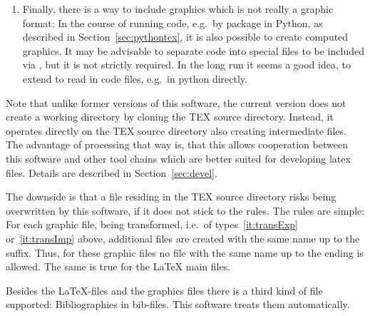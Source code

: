 \begin{enumerate}
The fourth kind of graphics formats 
has to be transformed into one of the kinds one or two 
but unlike in type three, this is not done explicitly 
by an external tool but by a latex-package during the \LaTeX-run. 
Note that, although not required to be explicitly transformed, 
those graphics files induce additional files 
by running \LaTeX.
Essentially, each of the abovementioned type of format
can be included that way but currently,
this is done for the \gls{svg}-format only
included by the package  (see~\cite{SvgP}).
The author personally refrains from using packages like that
because of the lack of flexibility and further drawbacks. 
\item 
Finally, there is a way to include graphics which is not really a graphic format: 
In the course of running code, e.g.~by package  in Python, 
as described in Section~\ref{sec:pythontex}, 
it is also possible to create computed graphics. 
It may be advisable to separate code into special files to be included via , 
but it is not strictly required. 
In the long run it seems a good idea, to extend  
to read in code files, e.g.~in python directly. 
\end{enumerate}


Note that unlike former versions of this software, 
the current version does not create a working directory 
by cloning the TEX source directory. 
Instead, it operates directly on the TEX source directory 
also creating intermediate files.
The advantage of processing that way is,
that this allows cooperation between this software
and other tool chains which are better suited for developing latex files.
Details are described in Section~\ref{sec:devel}.

The downside is that a file residing in the TEX source directory 
risks being overwritten by this software, 
if it does not stick to the rules. 
The rules are simple: 
For each graphic file, being transformed, 
i.e.~of types~\ref{it:transExp} or~\ref{it:transImp} above, 
additional files are created with the same name up to the suffix. 
Thus, for these graphic files no file with the same name 
up to the ending is allowed. 
The same is true for the \LaTeX{} main files.

Besides the \LaTeX-files and the graphics files
there is a third kind of file supported:
Bibliographies in bib-files.
This software treats them automatically. 


